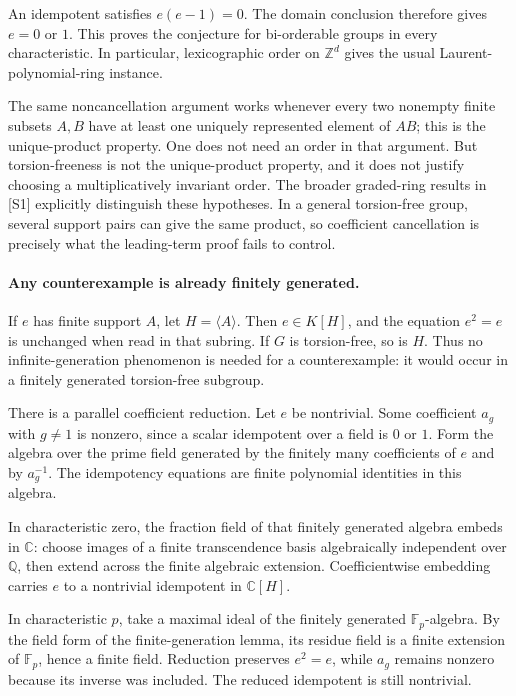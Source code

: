 \documentclass[11pt]{article}
\begin{document}
An idempotent satisfies $e(e-1)=0$. The domain conclusion therefore gives $e=0$ or $1$. This proves the conjecture for bi-orderable groups in every characteristic. In particular, lexicographic order on $\mathbb Z^d$ gives the usual Laurent-polynomial-ring instance.

The same noncancellation argument works whenever every two nonempty finite subsets $A,B$ have at least one uniquely represented element of $AB$; this is the unique-product property. One does not need an order in that argument. But torsion-freeness is not the unique-product property, and it does not justify choosing a multiplicatively invariant order. The broader graded-ring results in [S1] explicitly distinguish these hypotheses. In a general torsion-free group, several support pairs can give the same product, so coefficient cancellation is precisely what the leading-term proof fails to control.

\paragraph{Any counterexample is already finitely generated.}
If $e$ has finite support $A$, let $H=\langle A\rangle$. Then $e\in K[H]$, and the equation $e^2=e$ is unchanged when read in that subring. If $G$ is torsion-free, so is $H$. Thus no infinite-generation phenomenon is needed for a counterexample: it would occur in a finitely generated torsion-free subgroup.

There is a parallel coefficient reduction. Let $e$ be nontrivial. Some coefficient $a_g$ with $g\ne1$ is nonzero, since a scalar idempotent over a field is $0$ or $1$. Form the algebra over the prime field generated by the finitely many coefficients of $e$ and by $a_g^{-1}$. The idempotency equations are finite polynomial identities in this algebra.

In characteristic zero, the fraction field of that finitely generated algebra embeds in $\mathbb C$: choose images of a finite transcendence basis algebraically independent over $\mathbb Q$, then extend across the finite algebraic extension. Coefficientwise embedding carries $e$ to a nontrivial idempotent in $\mathbb C[H]$.

In characteristic $p$, take a maximal ideal of the finitely generated $\mathbb F_p$-algebra. By the field form of the finite-generation lemma, its residue field is a finite extension of $\mathbb F_p$, hence a finite field. Reduction preserves $e^2=e$, while $a_g$ remains nonzero because its inverse was included. The reduced idempotent is still nontrivial.
\end{document}

